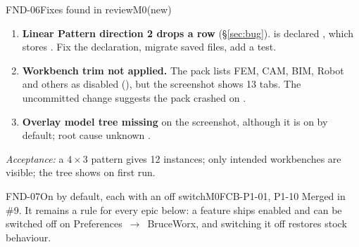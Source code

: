 \begin{epic}{FND-06}{Fixes found in review}{M0}{\stProg}{(new)}
\begin{enumerate}
  \item \textbf{Linear Pattern direction 2 drops a row} (\S\ref{sec:bug}).  is declared
        \code{(\{\})}, which stores \code{[0.0]}. Fix the declaration, migrate saved files, add a test.
  \item \textbf{Workbench trim not applied.} The pack lists FEM, CAM, BIM, Robot and others as disabled
        (), but the screenshot shows 13 tabs. The uncommitted
         change suggests the pack crashed on  \verify.
  \item \textbf{Overlay model tree missing} on the screenshot, although it is on by default; root cause unknown \verify.
\end{enumerate}
\emph{Acceptance:} a $4\times3$ pattern gives 12 instances; only intended workbenches are visible; the tree shows on first run.
\end{epic}

\begin{epic}{FND-07}{On by default, each with an off switch}{M0}{\stDone}{FCB-P1-01, P1-10}
Merged in \#9. It remains a rule for every epic below: a feature ships enabled and can be switched off on
Preferences~$\rightarrow$~BruceWorx, and switching it off restores stock behaviour.
\end{epic}
